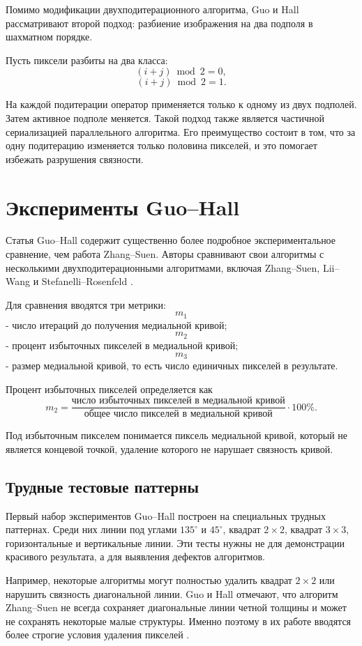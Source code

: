 \documentclass[12pt,a4paper]{article}
\begin{document}
Помимо модификации двухподитерационного алгоритма, Guo и Hall рассматривают второй подход: разбиение изображения на два подполя в шахматном порядке.

Пусть пиксели разбиты на два класса:
\[
    (i+j)\bmod 2 = 0,
\]
\[
    (i+j)\bmod 2 = 1.
\]

На каждой подитерации оператор применяется только к одному из двух подполей. Затем активное подполе меняется. Такой подход также является частичной сериализацией параллельного алгоритма. Его преимущество состоит в том, что за одну подитерацию изменяется только половина пикселей, и это помогает избежать разрушения связности.

\section{Эксперименты Guo--Hall}

Статья Guo--Hall содержит существенно более подробное экспериментальное сравнение, чем работа Zhang--Suen. Авторы сравнивают свои алгоритмы с несколькими двухподитерационными алгоритмами, включая Zhang--Suen, Lii--Wang и Stefanelli--Rosenfeld \cite{guo1989}.

Для сравнения вводятся три метрики:
\[
    m_1
\]
- число итераций до получения медиальной кривой;
\[
    m_2
\]
- процент избыточных пикселей в медиальной кривой;
\[
    m_3
\]
- размер медиальной кривой, то есть число единичных пикселей в результате.

Процент избыточных пикселей определяется как
\[
    m_2 =
    \frac{
    \text{число избыточных пикселей в медиальной кривой}
    }{
    \text{общее число пикселей в медиальной кривой}
    }
    \cdot 100\%.
\]

Под избыточным пикселем понимается пиксель медиальной кривой, который не является концевой точкой, удаление которого не нарушает связность кривой.

\subsection{Трудные тестовые паттерны}

Первый набор экспериментов Guo--Hall построен на специальных трудных паттернах. Среди них линии под углами $135^\circ$ и $45^\circ$, квадрат $2\times2$, квадрат $3\times3$, горизонтальные и вертикальные линии. Эти тесты нужны не для демонстрации красивого результата, а для выявления дефектов алгоритмов.

Например, некоторые алгоритмы могут полностью удалить квадрат $2\times2$ или нарушить связность диагональной линии. Guo и Hall отмечают, что алгоритм Zhang--Suen не всегда сохраняет диагональные линии четной толщины и может не сохранять некоторые малые структуры. Именно поэтому в их работе вводятся более строгие условия удаления пикселей \cite{guo1989}.
\end{document}
